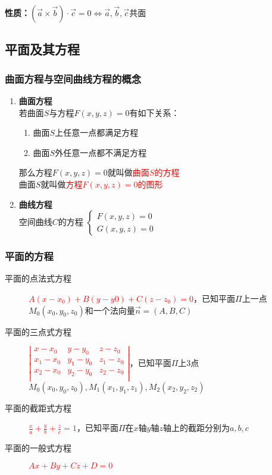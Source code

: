 \documentclass{article} %
\begin{document}
\textbf{性质：}$(\overrightarrow{a}\times\overrightarrow{b})\cdot\overrightarrow{c}=0 \Leftrightarrow
\overrightarrow{a},\overrightarrow{b},\overrightarrow{c}$共面

\subsection{平面及其方程}
\subsubsection{曲面方程与空间曲线方程的概念}
\begin{enumerate}
    \item \textbf{曲面方程}\\若曲面$S$与方程$F(x,y,z)=0$有如下关系：
    \begin{enumerate}
        \item 曲面$S$上任意一点都满足方程
        \item 曲面$S$外任意一点都不满足方程
    \end{enumerate}

    那么方程$F(x,y,z)=0$就叫做\textcolor{red}{曲面$S$的方程}\\
    曲面$S$就叫做\textcolor{red}{方程$F(x,y,z)=0$的图形}

    \item \textbf{曲线方程}\\
    空间曲线$C$的方程
    $\left\{\begin{array}{l}
        F(x,y,z)=0\\
        G(x,y,z)=0
    \end{array}
    \right.
    $
\end{enumerate}

\subsubsection{平面的方程}
\begin{description}
    \item [平面的点法式方程]{\textcolor{red}{$A(x-x_0)+B(y-y0)+C(z-z_0)=0$}，已知平面$\Pi$上一点$M_0(x_0,y_0,z_0)$和一个法向量$\overrightarrow{n}=(A,B,C)$}
    \item [平面的三点式方程]{\textcolor{red}{$\left|\begin{array}{ccc}
        x-x_0 & y-y_0 & z-z_0 \\
        x_1-x_0 & y_1-y_0 & z_1-z_0 \\
        x_2-x_0 & y_2-y_0 & z_2-z_0 \\
        \end{array}\right|$}，已知平面$\Pi$上3点$M_0(x_0,y_0,z_0),M_1(x_1,y_1,z_1),M_2(x_2,y_2,z_2)$}
    \item [平面的截距式方程]{\textcolor{red}{$\displaystyle\frac{x}{a}+\frac{y}{b}+\frac{z}{c}=1$}，已知平面$\Pi$在$x$轴$y$轴$z$轴上的截距分别为$a,b,c$}
    \item [平面的一般式方程]{\textcolor{red}{$Ax+By+Cz+D=0$}}
\end{description}
\end{document}
